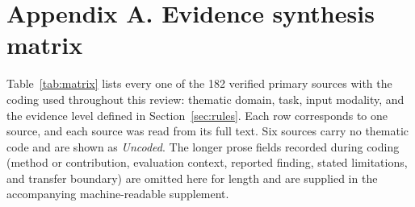 \makeatletter
\newif\ifrestoretwocol
\if@twocolumn\restoretwocoltrue\fi
\makeatother
\clearpage
\onecolumn
\section*{Appendix A. Evidence synthesis matrix}
\label{app:matrix}

Table~\ref{tab:matrix} lists every one of the 182 verified primary sources
with the coding used throughout this review: thematic domain, task, input modality,
and the evidence level defined in Section~\ref{sec:rules}. Each row corresponds to
one source, and each source was read from its full text. Six sources carry
no thematic code and are shown as \textit{Uncoded}. The longer prose fields recorded
during coding (method or contribution, evaluation context, reported finding, stated
limitations, and transfer boundary) are omitted here for length and are supplied in
the accompanying machine-readable supplement.

